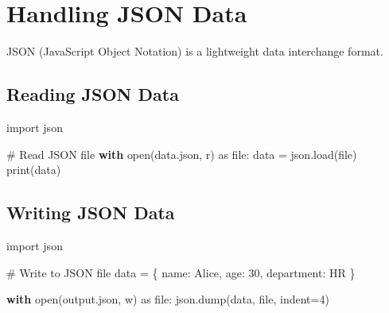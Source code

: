 \documentclass[
  letterpaper,
  DIV=11,
  numbers=noendperiod]{scrreprt}
\newenvironment{Shaded}{\begin{snugshade}}{\end{snugshade}}
\newcommand{\BuiltInTok}[1]{\textcolor[rgb]{0.00,0.23,0.31}{#1}}
\newcommand{\CommentTok}[1]{\textcolor[rgb]{0.37,0.37,0.37}{#1}}
\newcommand{\ControlFlowTok}[1]{\textcolor[rgb]{0.00,0.23,0.31}{\textbf{#1}}}
\newcommand{\DecValTok}[1]{\textcolor[rgb]{0.68,0.00,0.00}{#1}}
\newcommand{\ImportTok}[1]{\textcolor[rgb]{0.00,0.46,0.62}{#1}}
\newcommand{\NormalTok}[1]{\textcolor[rgb]{0.00,0.23,0.31}{#1}}
\newcommand{\OperatorTok}[1]{\textcolor[rgb]{0.37,0.37,0.37}{#1}}
\newcommand{\StringTok}[1]{\textcolor[rgb]{0.13,0.47,0.30}{#1}}
\begin{document}
\section{Handling JSON Data}\label{handling-json-data}

JSON (JavaScript Object Notation) is a lightweight data interchange
format.

\subsection{Reading JSON Data}\label{reading-json-data}

\begin{Shaded}
\begin{Highlighting}[]
\ImportTok{import}\NormalTok{ json}

\CommentTok{\# Read JSON file}
\ControlFlowTok{with} \BuiltInTok{open}\NormalTok{(}\StringTok{\textquotesingle{}data.json\textquotesingle{}}\NormalTok{, }\StringTok{\textquotesingle{}r\textquotesingle{}}\NormalTok{) }\ImportTok{as} \BuiltInTok{file}\NormalTok{:}
\NormalTok{    data }\OperatorTok{=}\NormalTok{ json.load(}\BuiltInTok{file}\NormalTok{)}
    \BuiltInTok{print}\NormalTok{(data)}
\end{Highlighting}
\end{Shaded}

\subsection{Writing JSON Data}\label{writing-json-data}

\begin{Shaded}
\begin{Highlighting}[]
\ImportTok{import}\NormalTok{ json}

\CommentTok{\# Write to JSON file}
\NormalTok{data }\OperatorTok{=}\NormalTok{ \{}
    \StringTok{\textquotesingle{}name\textquotesingle{}}\NormalTok{: }\StringTok{\textquotesingle{}Alice\textquotesingle{}}\NormalTok{,}
    \StringTok{\textquotesingle{}age\textquotesingle{}}\NormalTok{: }\DecValTok{30}\NormalTok{,}
    \StringTok{\textquotesingle{}department\textquotesingle{}}\NormalTok{: }\StringTok{\textquotesingle{}HR\textquotesingle{}}
\NormalTok{\}}

\ControlFlowTok{with} \BuiltInTok{open}\NormalTok{(}\StringTok{\textquotesingle{}output.json\textquotesingle{}}\NormalTok{, }\StringTok{\textquotesingle{}w\textquotesingle{}}\NormalTok{) }\ImportTok{as} \BuiltInTok{file}\NormalTok{:}
\NormalTok{    json.dump(data, }\BuiltInTok{file}\NormalTok{, indent}\OperatorTok{=}\DecValTok{4}\NormalTok{)}
\end{Highlighting}
\end{Shaded}
\end{document}
